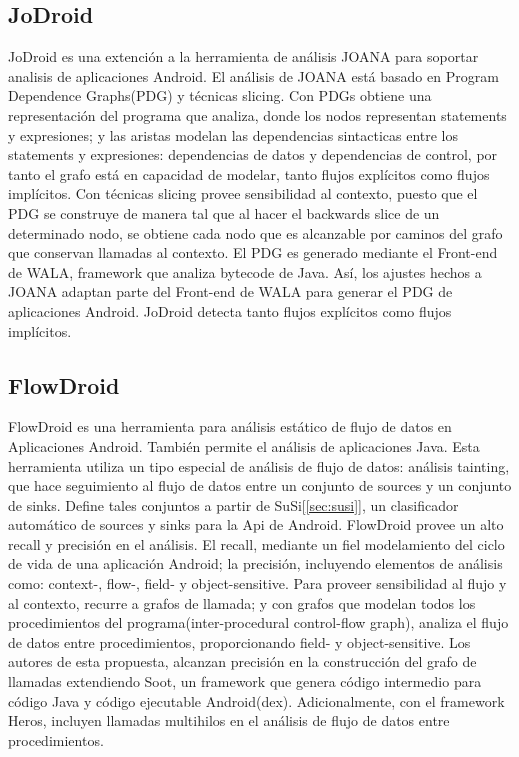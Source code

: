 \subsection{JoDroid}
JoDroid\cite{JoDroid-Paper} es una extención a la herramienta de análisis JOANA
para soportar analisis de aplicaciones Android.\newline 
El análisis de JOANA está basado en Program Dependence Graphs(PDG) y técnicas
slicing. Con PDGs obtiene una representación del programa que
analiza, donde los nodos representan statements y expresiones; y las aristas
modelan las dependencias sintacticas entre los statements y expresiones:
dependencias de datos y dependencias de control, por tanto el grafo está en
capacidad de modelar, tanto flujos explícitos como flujos implícitos.\newline
Con técnicas slicing provee sensibilidad al contexto, puesto que el PDG se
construye de manera tal que al hacer el backwards slice de un determinado nodo,
se obtiene cada nodo que es alcanzable por caminos del grafo que conservan
llamadas al contexto.\newline
El PDG es generado mediante el Front-end de WALA, framework que analiza bytecode
de Java. Así, los ajustes hechos a JOANA adaptan parte del Front-end de WALA
para generar el PDG de aplicaciones Android.\newline
JoDroid detecta tanto flujos explícitos como flujos implícitos.

\subsection{FlowDroid}
\label{FlowDroid-Tool}
FlowDroid es una herramienta para análisis estático de flujo de datos en
Aplicaciones Android. También permite el análisis de aplicaciones Java.\newline
Esta herramienta utiliza un tipo especial de análisis de flujo de datos:
análisis tainting, que hace seguimiento al flujo de datos entre un conjunto de
sources y un conjunto de sinks. Define tales conjuntos a partir de
SuSi[\ref{sec:susi}], un clasificador automático de sources y sinks para la Api
de Android.\newline 
FlowDroid provee un alto recall y precisión\cite{FlowDroid-Thesis} en el
análisis. El recall, mediante un fiel modelamiento del ciclo de vida de una
aplicación Android; la precisión, incluyendo elementos de análisis como:
context-, flow-, field- y object-sensitive. Para proveer sensibilidad al flujo y
al contexto, recurre a grafos de llamada; y con grafos que modelan todos los
procedimientos del programa(inter-procedural control-flow graph), analiza el
flujo de datos entre procedimientos, proporcionando field- y object-sensitive.\newline
Los autores de esta propuesta, alcanzan precisión en la construcción del grafo
de llamadas extendiendo Soot\cite{Soot}, un framework que genera código
intermedio para código Java y código ejecutable Android(dex). Adicionalmente,
con el framework Heros\cite{heros}, incluyen llamadas multihilos en el análisis
de flujo de datos entre procedimientos.\newline


